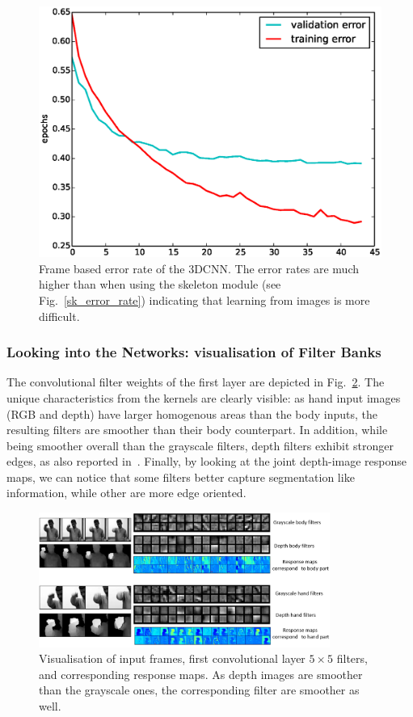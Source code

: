 \begin{figure}[t]
  \centering
  \includegraphics[width=.4\textwidth]{images/3dcnn_filters/training_error}
  \caption{Frame based error rate of the 3DCNN.
 The error rates are much higher than when using the skeleton module (see Fig.~\ref{sk_error_rate})
 indicating that  learning from images is more difficult. }
\label{fig:RGBErrorRate}
\end{figure}

\subsubsection{Looking into the Networks: visualisation of Filter Banks}

The convolutional filter weights of the first layer are depicted in Fig.~\ref{3dcnn_filters}.
The unique characteristics from the kernels are clearly visible: as hand input images (RGB and depth) have larger homogenous areas
than the body inputs, the resulting filters are smoother than their body counterpart.
In addition, while being smoother overall than the grayscale filters, depth filters exhibit stronger edges,
as also reported in~\cite{socher2012convolutional}.
%
Finally, by looking at the joint depth-image response maps, we can notice that some filters better capture segmentation like information,
while other are more edge oriented.

\begin{figure}[t]
  \centering
  \includegraphics[width=0.85\textwidth]{images/CNN_filters}
  \caption{Visualisation of input frames, first convolutional layer $5\times5$ filters, and corresponding response maps.
As depth images are smoother than the grayscale ones, the corresponding filter are smoother as well.
}\label{3dcnn_filters}
\end{figure}


